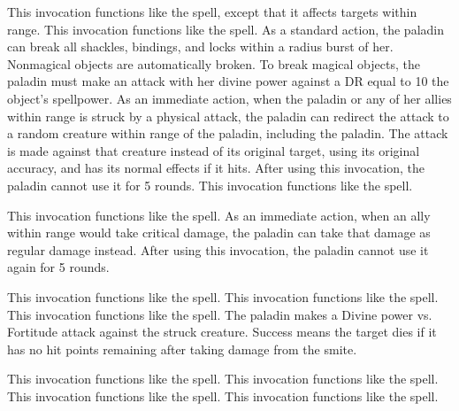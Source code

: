          This invocation functions like the  spell, except that it affects targets within \rngmed range.
         This invocation functions like the  spell.
        As a standard action, the paladin can break all shackles, bindings, and locks within a \arealarge radius burst of her.
        Nonmagical objects are automatically broken.
        To break magical objects, the paladin must make an attack with her divine power against a DR equal to 10 \add the object's spellpower.
        As an immediate action, when the paladin or any of her allies within \rngclose range is struck by a physical attack, the paladin can redirect the attack to a random creature within \rngclose range of the paladin, including the paladin.
        The attack is made against that creature instead of its original target, using its original accuracy, and has its normal effects if it hits.
        After using this invocation, the paladin cannot use it for 5 rounds.
         This invocation functions like the  spell.

        This invocation functions like the  spell.
        As an immediate action, when an ally within \rngmed range would take critical damage, the paladin can take that damage as regular damage instead.
        After using this invocation, the paladin cannot use it again for 5 rounds.

         This invocation functions like the  spell.
         This invocation functions like the  spell.
         This invocation functions like the  spell.
        The paladin makes a Divine power vs. Fortitude attack against the struck creature.
        Success means the target dies if it has no hit points remaining after taking damage from the smite.

         This invocation functions like the  spell.
         This invocation functions like the  spell.
         This invocation functions like the  spell.
         This invocation functions like the  spell.

